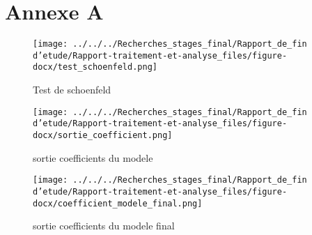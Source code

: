 \documentclass[a4paper,12pt]{report}
\begin{document}
\appendix
\chapter*{Annexe A}
\begin{figure}[H]
    \centering
\texttt{[image: ../../../Recherches\_stages\_final/Rapport\_de\_fin d'etude/Rapport-traitement-et-analyse\_files/figure-docx/test\_schoenfeld.png]} 
 \caption{Test de schoenfeld}
    \label{fig:test_schoenfeld}
\end{figure}

\begin{figure}[H]
    \centering
\texttt{[image: ../../../Recherches\_stages\_final/Rapport\_de\_fin d'etude/Rapport-traitement-et-analyse\_files/figure-docx/sortie\_coefficient.png]} 
 \caption{sortie coefficients du modele}
    \label{fig:sortie_coefficient}
\end{figure}

\begin{figure}[H]
    \centering
\texttt{[image: ../../../Recherches\_stages\_final/Rapport\_de\_fin d'etude/Rapport-traitement-et-analyse\_files/figure-docx/coefficient\_modele\_final.png]} 
 \caption{sortie coefficients du modele final}
    \label{fig:sortie_coefficient_modele}
\end{figure}
\end{document}
